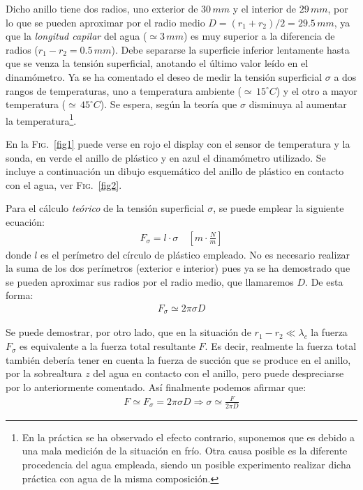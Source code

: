 \documentclass[12pt,a4paper]{article}
\newcommand{\grad}{^{\circ}}
\begin{document}
Dicho anillo tiene dos radios, uno exterior de $30\,mm$ y el interior de $29\,mm$, por lo que se pueden aproximar por el radio medio $D=(r_{1}+r_{2})/2=29.5\,mm$, ya que la \emph{longitud capilar} del agua ($\simeq 3\, mm$) es muy superior a la diferencia de radios ($r_{1}-r_{2}=0.5\, mm$). Debe separarse la superficie inferior lentamente hasta que se venza la tensión superficial, anotando el último valor leído en el dinamómetro. Ya se ha comentado el deseo de medir la tensión superficial $\sigma$ a dos rangos de temperaturas, uno a temperatura ambiente ($\simeq\,15 \grad C$) y el otro a mayor temperatura ($\simeq\,45 \grad C$). Se espera, según la teoría que $\sigma$ disminuya al aumentar la temperatura\footnote{En la práctica se ha observado el efecto contrario, suponemos que es debido a una mala medición de la situación en frío. Otra causa posible es la diferente procedencia del agua empleada, siendo un posible experimento realizar dicha práctica con agua de la misma composición.}.

En la \textsc{Fig.}~\ref{fig1} puede verse en rojo el display con el sensor de temperatura y la sonda, en verde el anillo de plástico y en azul el dinamómetro utilizado.
Se incluye a continuación un dibujo esquemático  del anillo de plástico en contacto con el agua, ver \textsc{Fig.}~\ref{fig2}.

Para el cálculo \emph{teórico} de la tensión superficial $\sigma$, se puede emplear la siguiente ecuación:
\begin{align*}
F_{\sigma}=l\cdot \sigma \,\,\,\,\,\, \left[ m\cdot \frac{N}{m}\right]
\end{align*}
donde $l$ es el perímetro del círculo de plástico empleado. No es necesario realizar la suma de los dos perímetros (exterior e interior) pues ya se ha demostrado que se pueden aproximar sus radios por el radio medio, que llamaremos $D$. De esta forma:
\begin{align*}
F_{\sigma}\simeq 2\pi \sigma D
\end{align*}

Se puede demostrar, por otro lado, que en la situación de $r_{1}-r_{2} \ll \lambda_{c}$ la fuerza $F_{\sigma}$ es equivalente a la fuerza total resultante $F$. Es decir, realmente la fuerza total también debería tener en cuenta la fuerza de succión que se produce en el anillo, por la sobrealtura $z$ del agua en contacto con el anillo, pero puede despreciarse por lo anteriormente comentado. Así finalmente podemos afirmar que:
\begin{align*}
F \simeq F_{\sigma} = 2\pi \sigma D \Rightarrow \boxed{\sigma \simeq \frac{F}{2\pi D}}
\end{align*} 
\end{document}
